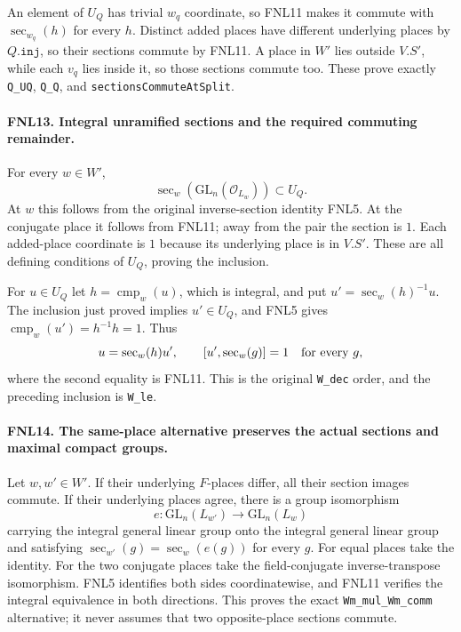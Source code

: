 \documentclass[11pt,a4paper]{article}
\numberwithin{equation}{section}
\theoremstyle{remark}\newtheorem{remark}[theorem]{Remark}
\begin{document}
An element of \(U_Q\) has trivial \(w_q\) coordinate, so FNL11
makes it commute with \(\operatorname{sec}_{w_q}(h)\) for every
\(h\).  Distinct added places have different underlying places by
\(Q.\texttt{inj}\), so their sections commute by FNL11.  A place
in \(W'\) lies outside \(V.S'\), while each \(v_q\) lies inside
it, so those sections commute too.  These prove exactly
\texttt{Q\_\allowbreak UQ}, \texttt{Q\_\allowbreak Q}, and
\texttt{sections\allowbreak Commute\allowbreak At\allowbreak Split}.

\paragraph{FNL13. Integral unramified sections and the required commuting remainder.}
\label{claim:FNL13}
For every \(w\in W'\),
\[
 \operatorname{sec}_w(\mathrm{GL}_n(\mathcal O_{L_w}))\subset U_Q.
\]
At \(w\) this follows from the original inverse-section identity
FNL5.  At the conjugate place it follows from FNL11; away from the
pair the section is \(1\).  Each added-place coordinate is \(1\)
because its underlying place is in \(V.S'\).  These are all defining
conditions of \(U_Q\), proving the inclusion.

For \(u\in U_Q\) let \(h=\operatorname{cmp}_w(u)\), which is
integral, and put \(u'=\operatorname{sec}_w(h)^{-1}u\).
The inclusion just proved implies \(u'\in U_Q\), and FNL5 gives
\(\operatorname{cmp}_w(u')=h^{-1}h=1\).
Thus
\[
 u=\operatorname{sec}_w(h)u',\qquad
 [u',\operatorname{sec}_w(g)]=1\quad\hbox{for every }g,
\]
where the second equality is FNL11.  This is the original
\texttt{W\_\allowbreak dec} order, and the preceding inclusion is
\texttt{W\_\allowbreak le}.

\paragraph{FNL14. The same-place alternative preserves the actual sections and maximal compact groups.}
\label{claim:FNL14}
Let \(w,\allowbreak{} w'\in W'\).  If their underlying \(F\)-places differ,
all their section images commute.  If their underlying places agree,
there is a group isomorphism
\[
 e:\mathrm{GL}_n(L_{w'})\longrightarrow\mathrm{GL}_n(L_w)
\]
carrying the integral general linear group onto the integral general
linear group and satisfying
\(\operatorname{sec}_{w'}(g)=\operatorname{sec}_w(e(g))\) for every
\(g\).  For equal places take the identity.  For the two conjugate
places take the field-conjugate inverse-transpose isomorphism.
FNL5 identifies both sides coordinatewise, and FNL11 verifies the
integral equivalence in both directions.  This proves the exact
\texttt{Wm\_\allowbreak mul\_\allowbreak Wm\_\allowbreak comm} alternative; it never assumes that two
opposite-place sections commute.
\end{document}
